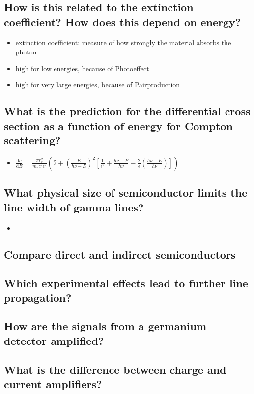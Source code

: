 \subsection*{How is this related to the extinction coefficient? How does this depend on energy?}
\begin{itemize}
    \item extinction coefficient: measure of how strongly the material
    absorbs the photon
    \item high for low energies, because of Photoeffect
    \item high for very large energies, because of Pairproduction
\end{itemize}


\subsection*{What is the prediction for the differential cross section
as a function of energy for Compton scattering?}
\begin{itemize}
    \item $\frac{\text{d}\sigma}{\text{d}E}=\frac{\pi r_e^2}{m_ec^2\epsilon^2}\left(2+\left(\frac{E}{h\nu-E}\right)^2\left[\frac{1}{\epsilon^2}+\frac{h\nu-E}{h\nu}-\frac{2}{\epsilon}\left(\frac{h\nu-E}{h\nu}\right)\right]\right)$
\end{itemize}

\subsection*{What physical size of semiconductor limits the line width
of gamma lines?}
\begin{itemize}
    \item 
\end{itemize}
\subsection*{Compare direct and indirect semiconductors}
\subsection*{Which experimental effects lead to further line 
propagation?}

\subsection*{How are the signals from a germanium detector amplified?}
\subsection*{What is the difference between charge and current 
amplifiers?}

